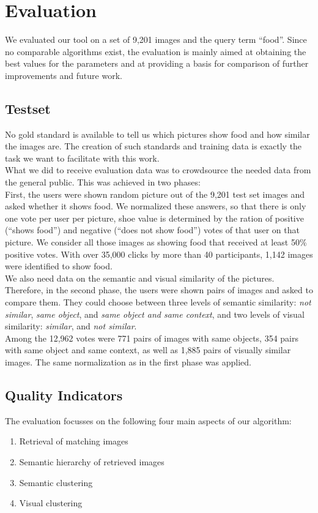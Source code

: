 %
\section{Evaluation}
\label{sec_literatur}

We evaluated our tool on a set of 9,201  images and the query term ``food''. Since no comparable algorithms exist, the evaluation is mainly aimed at obtaining the best values for the parameters and at providing a basis for comparison of further improvements and future work.

\subsection{Testset}
No gold standard is available to tell us which pictures show food and how similar the images are. The creation of such standards and training data is exactly the task we want to facilitate with this work.\\ 
What we did to receive evaluation data was to crowdsource the needed data from the general public. This was achieved in two phases:\\

First, the users were shown random picture out of the 9,201 test set images and asked whether it shows food. We normalized these answers, so that there is only one vote per user per picture, shoe value is determined by the ration of positive (``shows food'') and negative (``does not show food'') votes of that user on that picture. We consider all those images as showing food that received at least 50\% positive votes. With over 35,000 clicks by more than 40 participants, 1,142 images were identified to show food. \\

We also need data on the semantic and visual similarity of the pictures. Therefore, in the second phase, the users were shown pairs of images and asked to compare them. They could choose between three levels of semantic similarity: \emph{not similar}, \emph{same object}, and \emph{same object and same context}, and two levels of visual similarity: \emph{similar}, and \emph{not similar}.\\
Among the 12,962 votes were 771 pairs of images with same objects, 354 pairs with same object and same context, as well as 1,885 pairs of visually similar images. The same normalization as in the first phase was applied.

\subsection{Quality Indicators}
The evaluation focusses on the following four main aspects of our algorithm:
\begin{enumerate}
\item Retrieval of matching images
\item Semantic hierarchy of retrieved images
\item Semantic clustering
\item Visual clustering
\end{enumerate}

